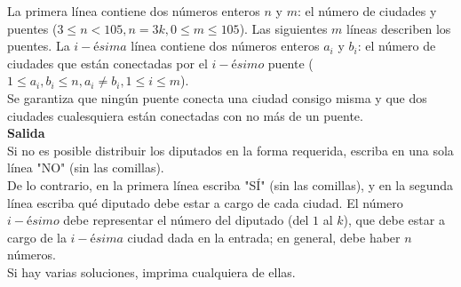 \documentclass[12pt, a4paper]{article}
\begin{document}
		La primera línea contiene dos números enteros $n$ y $m$: el número de ciudades y puentes ($3 \le n < 105, n = 3k, 0 \le m \le 105$). Las siguientes $m$ líneas describen los puentes. La $i-ésima$ línea contiene dos números enteros $a_i$ y $b_i$: el número de ciudades que están conectadas por el $i-ésimo$ puente ($1 \le a_i, b_i \le n, a_i \neq b_i, 1 \le i \le m$).\\

		Se garantiza que ningún puente conecta una ciudad consigo misma y que dos ciudades cualesquiera están conectadas con no más de un puente.\\

		{\bf Salida}\\

		Si no es posible distribuir los diputados en la forma requerida, escriba en una sola línea "NO" (sin las comillas).\\

		De lo contrario, en la primera línea escriba "SÍ" (sin las comillas), y en la segunda línea escriba qué diputado debe estar a cargo de cada ciudad. El número $i-ésimo$ debe representar el número del diputado (del $1$ al $k$), que debe estar a cargo de la $i-ésima$ ciudad dada en la entrada; en general, debe haber $n$ números.\\

		Si hay varias soluciones, imprima cualquiera de ellas.
		\newpage
\end{document}

